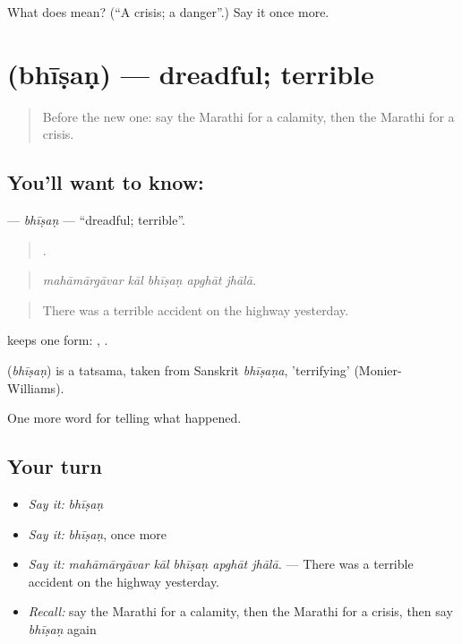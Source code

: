 \begin{tcolorbox}[breakable,colback=teal!4,colframe=teal!35!black,title={Before you move on}]
What does  mean? (\textquotedblleft{}A crisis; a danger\textquotedblright{}.) Say it once more.
\end{tcolorbox}
\section[\texorpdfstring{\mr{भीषण} (bhīṣaṇ)}{भीषण (bhīṣaṇ)}]{ (bhīṣaṇ) — dreadful; terrible}

\label{lesson:MR-C295-bhisan}



\begin{quote}
Before the new one: say the Marathi for a calamity, then the Marathi for a crisis.
\end{quote}

\subsection*{You'll want to know: }
\textbf{} — \emph{bhīṣaṇ} — \textquotedblleft{}dreadful; terrible\textquotedblright{}.

\begin{quote}
    .
\end{quote}

\begin{quote}
\emph{mahāmārgāvar kāl bhīṣaṇ apghāt jhālā.}
\end{quote}

\begin{quote}
There was a terrible accident on the highway yesterday.
\end{quote}

 keeps one form:  ,  .

\begin{cousinweb}
\textbf{} (\emph{bhīṣaṇ}) is a tatsama, taken from Sanskrit \emph{bhīṣaṇa}, 'terrifying' (Monier-Williams).
\end{cousinweb}

\begin{grammarlens}[title={What you've built}]
One more word for telling what happened.
\end{grammarlens}

\subsection*{Your turn}
\begin{itemize}
\raggedright
  \item \emph{Say it:} \emph{bhīṣaṇ}
  \item \emph{Say it:} \emph{bhīṣaṇ}, once more
  \item \emph{Say it:} \emph{mahāmārgāvar kāl bhīṣaṇ apghāt jhālā.} — There was a terrible accident on the highway yesterday.
  \item \emph{Recall:} say the Marathi for a calamity, then the Marathi for a crisis, then say \emph{bhīṣaṇ} again
\end{itemize}

